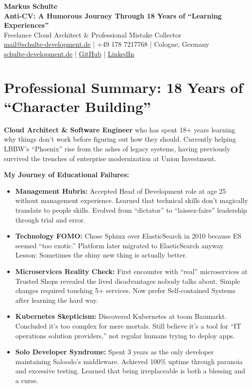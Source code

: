 \documentclass[11pt,a4paper]{article}
\begin{document}
\begin{center}
{\Huge \textbf{Markus Schulte}}\\[0.3em]
{\Large \textbf{Anti-CV: A Humorous Journey Through 18 Years of ``Learning Experiences''}}\\[0.3em]
{\large Freelance Cloud Architect \& Professional Mistake Collector}\\[0.3em]
\href{mailto:mail@schulte-development.de}{mail@schulte-development.de} | +49 178 7217768 | Cologne, Germany\\
\href{https://schulte-development.de}{schulte-development.de} | \href{https://github.com/SchulteDev}{GitHub} | \href{https://linkedin.com/in/markus-schulte}{LinkedIn}
\end{center}

\vspace{0.5em}

\section*{Professional Summary: 18 Years of ``Character Building''}

\textbf{Cloud Architect \& Software Engineer} who has spent 18+ years learning why things don't work before figuring out how they should. Currently helping LBBW's ``Phoenix'' rise from the ashes of legacy systems, having previously survived the trenches of enterprise modernization at Union Investment.

\textbf{My Journey of Educational Failures:}
\begin{itemize}[nosep,leftmargin=1.5em]
    \item \textbf{Management Hubris:} Accepted Head of Development role at age 25 without management experience. Learned that technical skills don't magically translate to people skills. Evolved from ``dictator'' to ``laissez-faire'' leadership through trial and error.
    \item \textbf{Technology FOMO:} Chose Sphinx over ElasticSearch in 2010 because ES seemed ``too exotic.'' Platform later migrated to ElasticSearch anyway. Lesson: Sometimes the shiny new thing is actually better.
    \item \textbf{Microservices Reality Check:} First encounter with ``real'' microservices at Trusted Shops revealed the lived disadvantages nobody talks about. Simple changes required touching 5+ services. Now prefer Self-contained Systems after learning the hard way.
    \item \textbf{Kubernetes Skepticism:} Discovered Kubernetes at toom Baumarkt. Concluded it's too complex for mere mortals. Still believe it's a tool for ``IT operations solution providers,'' not regular humans trying to deploy apps.
    \item \textbf{Solo Developer Syndrome:} Spent 3 years as the only developer maintaining Saloodo's middleware. Achieved 100\% uptime through paranoia and excessive testing. Learned that being irreplaceable is both a blessing and a curse.
\end{itemize}
\end{document}
